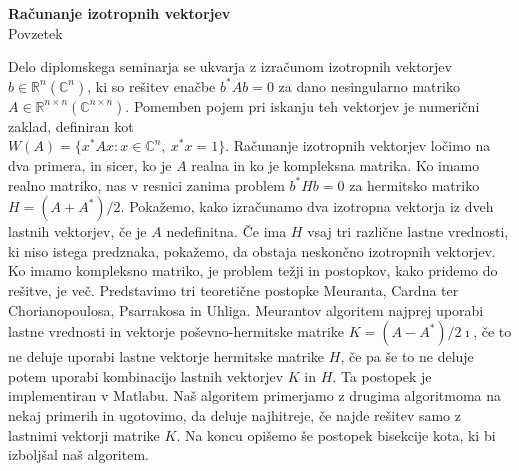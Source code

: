 \documentclass[12pt,a4paper]{amsart}
\theoremstyle{definition}
\theoremstyle{plain}
\newcommand{\R}{\mathbb R}
\newcommand{\C}{\mathbb C}
\begin{document}
\thispagestyle{empty}
\begin{center}
{\bf Računanje izotropnih vektorjev}\\[3mm]
{\sc Povzetek}
\end{center}
Delo diplomskega seminarja se ukvarja z izračunom izotropnih vektorjev $b\in\R^{n} (\C^{n})$, ki so rešitev enačbe $b^\ast Ab=0$ za dano nesingularno matriko $A\in\R^{n\times n} (\C^{n\times n}).$
Pomemben pojem pri iskanju teh vektorjev je numerični zaklad, definiran kot\\ $W(A)=\{x^\ast Ax\! : x \in \C^n,\ x^\ast x=1\}.$ %
Računanje izotropnih vektorjev ločimo na dva primera, in sicer, ko je $A$ realna in ko je kompleksna matrika.
Ko imamo realno matriko, nas v resnici zanima problem $b^\ast Hb=0$ za hermitsko matriko $H=(A+A^\ast)/2$. 
Pokažemo, kako izračunamo dva izotropna vektorja iz dveh lastnih vektorjev, če je $A$ nedefinitna. Če ima $H$ vsaj tri različne lastne vrednosti, ki niso istega predznaka, pokažemo, da obstaja neskončno izotropnih vektorjev.
Ko imamo kompleksno matriko, je problem težji in postopkov, kako pridemo do rešitve, je več. Predstavimo tri teoretične postopke Meuranta, Cardna ter Chorianopoulosa, Psarrakosa in Uhliga.
Meurantov algoritem najprej uporabi lastne vrednosti in vektorje poševno-hermitske matrike $K=(A-A^\ast)/2\imath$, če to ne deluje uporabi lastne vektorje hermitske matrike $H$, če pa še to ne deluje potem uporabi kombinacijo lastnih vektorjev $K$ in $H$.
Ta postopek je implementiran v Matlabu.
Naš algoritem primerjamo z drugima algoritmoma na nekaj primerih in ugotovimo, da deluje najhitreje, če najde rešitev samo z lastnimi vektorji matrike $K$. %
Na koncu opišemo še postopek bisekcije kota, ki bi izboljšal naš algoritem.
\end{document}
